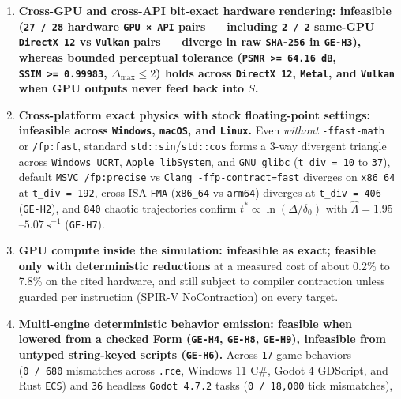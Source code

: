 \documentclass[10pt,letterpaper]{article}
\providecommand{\tightlist}{\setlength{\itemsep}{1pt}\setlength{\parskip}{0pt}}
\begin{document}
\begin{enumerate}
\def\labelenumi{\arabic{enumi}.}
\tightlist
\item
  \textbf{Cross-GPU and cross-API bit-exact hardware rendering:
  infeasible (\texttt{27\ /\ 28} hardware \texttt{GPU\ ×\ API} pairs ---
  including \texttt{2\ /\ 2} same-GPU \texttt{DirectX\ 12} vs
  \texttt{Vulkan} pairs --- diverge in raw \texttt{SHA-256} in
  \texttt{GE-H3}), whereas bounded perceptual tolerance
  (\texttt{PSNR\ \textgreater{}=\ 64.16\ dB},
  \texttt{SSIM\ \textgreater{}=\ 0.99983}, \(\Delta_{\max} \le 2\))
  holds across \texttt{DirectX\ 12}, \texttt{Metal}, and \texttt{Vulkan}
  when GPU outputs never feed back into \(S\).}
\item
  \textbf{Cross-platform exact physics with stock floating-point
  settings: infeasible across \texttt{Windows}, \texttt{macOS}, and
  \texttt{Linux}.} Even \emph{without} \texttt{-\allowbreak{}ffast-\allowbreak{}math} or
  \texttt{/fp:fast}, standard \texttt{std::sin}/\allowbreak{}\texttt{std::cos} forms
  a 3-way divergent triangle across \texttt{Windows\ UCRT},
  \texttt{Apple\ libSystem}, and \texttt{GNU\ glibc}
  (\texttt{t\_\allowbreak{}div\ =\ 10} to \texttt{37}), default
  \texttt{MSVC\ /\allowbreak{}fp:precise} vs \texttt{Clang\ -\allowbreak{}ffp-\allowbreak{}contract=fast}
  diverges on \texttt{x86\_64} at \texttt{t\_\allowbreak{}div\ =\ 192}, cross-ISA
  \texttt{FMA} (\texttt{x86\_64} vs \texttt{arm64}) diverges at
  \texttt{t\_\allowbreak{}div\ =\ 406} (\texttt{GE-H2}), and \texttt{840} chaotic
  trajectories confirm \(t^* \propto \ln(\Delta/\delta_0)\) with
  \(\hat{\Lambda} = 1.95\)--\(5.07\ \text{s}^{-1}\) (\texttt{GE-H7}).
\item
  \textbf{GPU compute inside the simulation: infeasible as exact;
  feasible only with deterministic reductions} at a measured cost of
  about 0.2\% to 7.8\% on the cited hardware, and still subject to
  compiler contraction unless guarded per instruction (SPIR-V
  NoContraction) on every target.
\item
  \textbf{Multi-engine deterministic behavior emission: feasible when
  lowered from a checked Form (\texttt{GE-H4}, \texttt{GE-H8},
  \texttt{GE-H9}), infeasible from untyped string-keyed scripts
  (\texttt{GE-H6}).} Across \texttt{17} game behaviors
  (\texttt{0\ /\ 680} mismatches across \texttt{.rce}, Windows 11 C\#,
  Godot 4 GDScript, and Rust \texttt{ECS}) and \texttt{36} headless
  \texttt{Godot\ 4.\allowbreak{}7.\allowbreak{}2} tasks (\texttt{0\ /\allowbreak{}\ 18,\allowbreak{}000} tick mismatches),

\end{enumerate}
\end{document}
